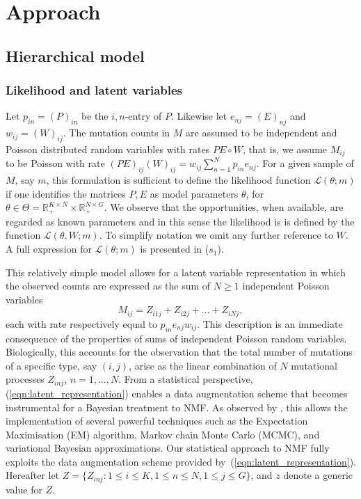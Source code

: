 \documentclass{bioinfo}
\begin{document}
\section{Approach}
\subsection{Hierarchical model}
\subsubsection{Likelihood and latent variables}
Let $p_{in} = (P)_{in}$ be the $i,n$-entry of $P$. Likewise let
$e_{nj} = (E)_{nj}$ and $w_{ij} = (W)_{ij}$.  The mutation counts in
$M$ are assumed to be independent and Poisson distributed random
variables with rates $PE\circ W$, that is, we assume $M_{ij}$ to be
Poisson with rate $(PE)_{ij}(W)_{ij} = w_{ij}\sum_{n=1}^N
p_{in}e_{nj}$. For a given sample of $M$, say $m$, this formulation is
sufficient to define the likelihood function $\mathcal L(\theta; m)$
if one identifies the matrices $P, E$ as model parameters $\theta$,
for $\theta \in \Theta = \mathbb R_+^{K\times N}\times \mathbb
R_+^{N\times G}$. We observe that the opportunities, when available,
are regarded as known parameters and in this sense the likelihood is
is  defined by the function $\mathcal L(\theta, W; m)$. To simplify 
notation we omit any further reference to $W$. A full expression
for $\mathcal L(\theta; m)$ is presented in ($s_1$).


This relatively simple model allows for a latent variable
representation in which the observed counts are expressed as the sum
of $N\geqslant 1$ independent Poisson variables
\begin{equation}
  \label{eqn:latent_representation}
   M_{ij} = Z_{i1j} + Z_{i2j} + \ldots + Z_{iNj},
\end{equation} 
each with rate respectively equal to $p_{in}e_{nj}w_{ij}$. This
description is an immediate consequence of the properties of sums of
independent Poisson random variables. Biologically, this accounts for
the observation that the total number of mutations of a specific type,
say $(i,j)$, arise as the linear combination of $N$ mutational
processes $Z_{inj}$, $n = 1, \ldots, N$. From a statistical
perspective, (\ref{eqn:latent_representation}) enables a data
augmentation scheme that becomes instrumental for a Bayesian treatment
to NMF. As observed by \cite{C}, this allows the implementation of
several powerful techniques such as the Expectation Maximisation (EM)
algorithm, Markov chain Monte Carlo (MCMC), and variational Bayesian
approximations.  Our statistical approach to NMF fully exploits the
data augmentation scheme provided
by~(\ref{eqn:latent_representation}).  Hereafter let $Z = \{Z_{inj}:
1\leqslant i\leqslant K, 1\leqslant n \leqslant N, 1\leqslant
j\leqslant G\}$, and $z$ denote a generic value for $Z$.
\end{document}
